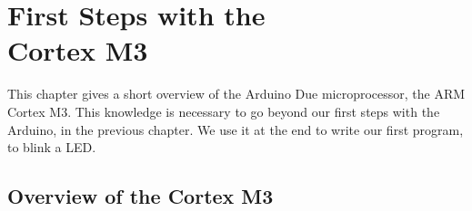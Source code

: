 
\renewcommand{\rustfile}{chapter2}
\setcounter{rustid}{0}

\chapter[First Steps with the Cortex M3]{First Steps with the\\Cortex
M3}\label{chapter:microprocessor}

This chapter gives a short overview of the Arduino Due microprocessor, the ARM
Cortex M3. This knowledge is necessary to go beyond our first steps with the
Arduino, in the previous chapter. We use it at the end to write our first
program, to blink a LED.

\section{Overview of the Cortex M3}\label{section:cortex-m3}

